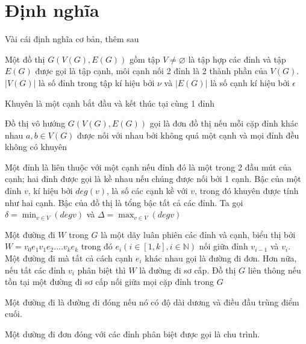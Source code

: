 \section{Định nghĩa}

Vài cái định nghĩa cơ bản, thêm sau

\begin{definition}[Đồ thị]
    Một đồ thị $G(V(G),E(G))$ gồm tập $V \neq \varnothing $ là tập hợp các đỉnh và tập $E(G)$ được gọi là tập cạnh, môi cạnh nối 2 đỉnh là 2 thành phần của $V(G)$. $|V(G)|$ là số đỉnh trong tập kí hiệu bởi $\nu$ và $|E(G)|$ là số cạnh kí hiệu bởi $\epsilon$
\end{definition}

\begin{definition}[Khuyên]
    Khuyên là một cạnh bắt đầu và kết thúc tại cùng 1 đỉnh
\end{definition}

\begin{definition}
    Đồ thị vô hướng $G(V(G),E(G))$ gọi là đơn đồ thị nếu mỗi cặp đỉnh khác nhau $a,b \in V(G)$ được nối với nhau bởi không quá một cạnh và mọi đỉnh đều không có khuyên
\end{definition}

\begin{definition}
    Một đỉnh là liên thuộc với một cạnh nếu đỉnh đó là một trong 2 đầu mút của cạnh; hai đỉnh được gọi là kề nhau nếu chúng được nối bởi 1 cạnh.
    Bậc của một đỉnh $v$, kí hiệu bởi $deg(v)$, là số các cạnh kề với $v$, trong đó khuyên được tính như hai cạnh. Bậc của đồ thị là tổng bậc tất cả các đỉnh.
    Ta gọi $\delta = \min_{v \in V}(deg v)$ và $\Delta = \max_{v \in V}(deg v)$
\end{definition}

\begin{definition}
    Một đường đi $W$ trong $G$ là một dãy luân phiên các đỉnh và cạnh, biểu thị bởi $W=v_0e_1v_1e_2....v_ke_k$ trong đó $e_i (i \in [1,k], i \in \mathbb{N})$ nối giữa đỉnh $v_{i-1}$ và $v_i$.
    Một đường đi mà tất cả cách cạnh $e_i$ khác nhau gọi là đường đi đơn.
    Hơn nữa, nếu tất các đỉnh $v_i$ phân biệt thì $W$ là đường đi sơ cấp.
    Đồ thị $G$ liên thông nếu tồn tại một đường đi sơ cấp nối giữa mọi cặp đỉnh trong $G$

    Một đường đi là đường đi đóng nếu nó có độ dài dương và điều đầu trùng điểm cuối.

    Một dường đi đơn đóng với các đỉnh phân biệt được gọi là chu trình.
\end{definition}

